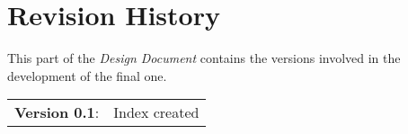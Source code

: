 \section{Revision History}

This part of the \emph{Design Document} contains the versions involved in the development of the final one.

\vspace{10pt}

\begin{tabular}{l l}

	\textbf{Version 0.1}:   & Index created \\

\end{tabular}